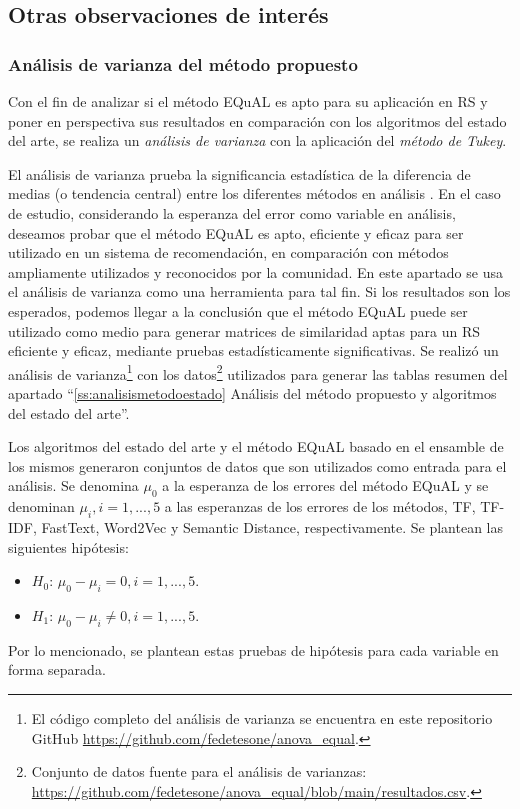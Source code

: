 \subsection{Otras observaciones de interés}

\subsubsection{Análisis de varianza del método propuesto}

Con el fin de analizar si el método EQuAL es apto para su aplicación en RS y poner en perspectiva sus resultados en comparación con los algoritmos del estado del arte, se realiza un \textit{análisis de varianza} con la aplicación del \textit{método de Tukey}.

\bigskip El análisis de varianza prueba la significancia estadística de la diferencia de medias (o tendencia central) entre los diferentes métodos en análisis  \citep{tabachnick2007experimental}. En el caso de estudio, considerando la esperanza del error como variable en análisis, deseamos probar que el método EQuAL es apto, eficiente y eficaz para ser utilizado en un sistema de recomendación, en comparación con métodos ampliamente utilizados y reconocidos por la comunidad. En este apartado se usa el análisis de varianza como una herramienta para tal fin. Si los resultados son los esperados, podemos llegar a la conclusión que el método EQuAL puede ser utilizado como medio para generar matrices de similaridad aptas para un RS eficiente y eficaz, mediante pruebas estadísticamente significativas. Se realizó un análisis de varianza\footnote{El código completo del análisis de varianza se encuentra en este repositorio GitHub \url{https://github.com/fedetesone/anova_equal}.} con los datos\footnote{Conjunto de datos fuente para el análisis de varianzas: \url{https://github.com/fedetesone/anova_equal/blob/main/resultados.csv}.} utilizados para generar las tablas resumen del apartado “\ref{ss:analisismetodoestado} Análisis del método propuesto y algoritmos del estado del arte”.

\bigskip Los algoritmos del estado del arte y el método EQuAL basado en el ensamble de los mismos generaron conjuntos de datos que son utilizados como entrada para el análisis. Se denomina \(\mu_0\) a la esperanza de los errores del método EQuAL y se denominan \(\mu_i, i = 1,..., 5\) a las esperanzas de los errores de los métodos, TF, TF-IDF, FastText, Word2Vec y Semantic Distance, respectivamente. Se plantean las siguientes hipótesis:
\begin{itemize}
	\item \textbf{\(H_0\)}: \(\mu_0 - \mu_i = 0, i = 1,..., 5\).
	\item \textbf{\(H_1\)}: \(\mu_0 - \mu_i \neq 0, i = 1,..., 5\).
\end{itemize}
Por lo mencionado, se plantean estas pruebas de hipótesis para cada variable en forma separada.

